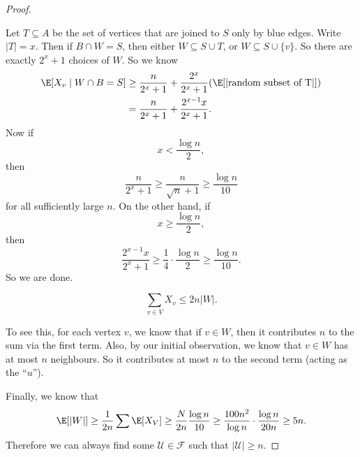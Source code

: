 \documentclass[a4paper]{article}
\begin{document}
\begin{proof}
\begin{center}
  \end{center}
  Let $T \subseteq A$ be the set of vertices that are joined to $S$ only by blue edges. Write $|T| = x$. Then if $B \cap W = S$, then either $W \subseteq S \cup T$, or $W \subseteq S \cup \{v\}$. So there are exactly $2^x + 1$ choices of $W$. So we know
  \begin{align*}
    \E[X_v \mid W \cap B = S] &\geq \frac{n}{2^x + 1} + \frac{2^x}{2^x + 1}(\E[|\text{random subset of T}|])\\
    &= \frac{n}{2^x + 1} + \frac{2^{x - 1}x}{2^x + 1}.
  \end{align*}
  Now if
  \[
    x < \frac{\log n}{2},
  \]
  then
  \[
    \frac{n}{2^x + 1} \geq \frac{n}{\sqrt{n} + 1} \geq \frac{\log n}{10}
  \]
  for all sufficiently large $n$. On the other hand, if
  \[
    x \geq \frac{\log n}{2},
  \]
  then
  \[
    \frac{2^{x - 1}x}{2^x + 1} \geq \frac{1}{4} \cdot \frac{\log n}{2} \geq \frac{\log n}{10}.
  \]
  So we are done.

  \begin{claim}
    \[
      \sum_{v \in V} X_v \leq 2n |W|.
    \]
  \end{claim}
  To see this, for each vertex $v$, we know that if $v \in W$, then it contributes $n$ to the sum via the first term. Also, by our initial observation, we know that $v \in W$ has at most $n$ neighbours. So it contributes at most $n$ to the second term (acting as the ``$u$'').

  Finally, we know that
  \[
    \E[|W|] \geq \frac{1}{2n} \sum \E[X_V] \geq \frac{N}{2n} \frac{\log n}{10} \geq \frac{100n^2}{\log n} \cdot \frac{\log n}{20 n} \geq 5n.
  \]
  Therefore we can always find some $\mathcal{U} \in \mathcal{F}$ such that $|\mathcal{U}| \geq n$.
\end{proof}
\end{document}
